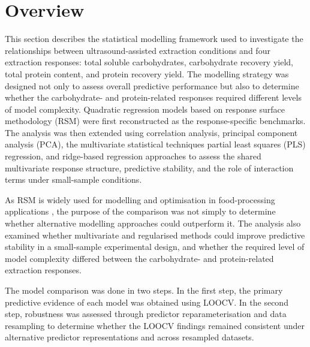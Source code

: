\documentclass[MScDSA]{uccthesis}
\begin{document}
\section{Overview}
\label{sec:modelling_overview}
This section describes the statistical modelling framework used to investigate the relationships between ultrasound-assisted extraction conditions and four extraction responses: total soluble carbohydrates, carbohydrate recovery yield, total protein content, and protein recovery yield. The modelling strategy was designed not only to assess overall predictive performance but also to determine whether the carbohydrate- and protein-related responses required different levels of model complexity. Quadratic regression models based on response surface methodology (RSM) were first reconstructed as the response-specific benchmarks. The analysis was then extended using correlation analysis, principal component analysis (PCA), the multivariate statistical techniques partial least squares (PLS) regression, and ridge-based regression approaches to assess the shared multivariate response structure, predictive stability, and the role of interaction terms under small-sample conditions.

As RSM is widely used for modelling and optimisation in food-processing applications \parencite{Yolmeh:2017}, the purpose of the comparison was not simply to determine whether alternative modelling approaches could outperform it. The analysis also examined whether multivariate and regularised methods could improve predictive stability in a small-sample experimental design, and whether the required level of model complexity differed between the carbohydrate- and protein-related extraction responses.

The model comparison was done in two steps. In the first step, the primary predictive evidence of each model was obtained using LOOCV. In the second step, robustness was assessed through predictor reparameterisation and data resampling to determine whether the LOOCV findings remained consistent under alternative predictor representations and across resampled datasets.
\end{document}
